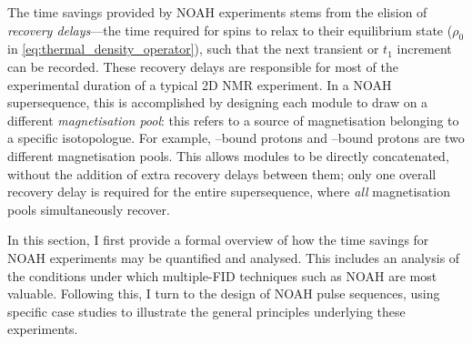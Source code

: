 The time savings provided by NOAH experiments stems from the elision of \textit{recovery delays}---the time required for spins to relax to their equilibrium state ($\rho_0$ in \cref{eq:thermal_density_operator}), such that the next transient or $t_1$ increment can be recorded.
These recovery delays are responsible for most of the experimental duration of a typical 2D NMR experiment.
In a NOAH supersequence, this is accomplished by designing each module to draw on a different \textit{magnetisation pool}: this refers to a source of magnetisation belonging to a specific isotopologue.
For example, \carbon{}--bound protons and \carbont{}--bound protons are two different magnetisation pools.
This allows modules to be directly concatenated, without the addition of extra recovery delays between them; only one overall recovery delay is required for the entire supersequence, where \textit{all} magnetisation pools simultaneously recover.

In this section, I first provide a formal overview of how the time savings for NOAH experiments may be quantified and analysed.
This includes an analysis of the conditions under which multiple-FID techniques such as NOAH are most valuable.
Following this, I turn to the design of NOAH pulse sequences, using specific case studies to illustrate the general principles underlying these experiments.




